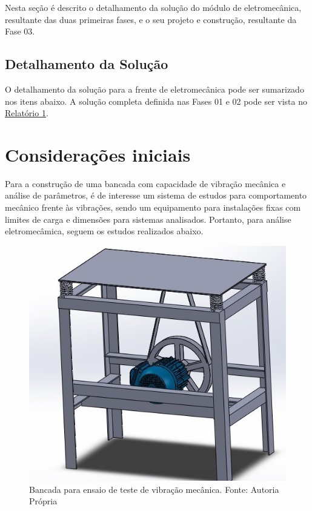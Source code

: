  \label{desenvolvimento_eletromecanica}
Nesta seção é descrito o detalhamento da solução do módulo de eletromecânica, resultante das duas primeiras fases,
e o seu projeto e construção, resultante da Fase 03.

\subsection{Detalhamento da Solução}

O detalhamento da solução para a frente de eletromecânica pode ser sumarizado nos itens abaixo. A solução completa definida nas
  Fases 01 e 02 pode ser vista no \href{https://drive.google.com/file/d/0B5InkGKx6O-MR1B3eVYzZFpjQ3c/view?usp=sharing}{Relatório 1}.

\section{Considerações iniciais}

Para a construção de uma bancada com capacidade de vibração mecânica e análise de parâmetros, é de interesse um sistema de estudos para comportamento mecânico frente às vibrações, sendo um equipamento para instalações fixas com limites de carga e dimensões para sistemas analisados. Portanto, para análise eletromecâmica, seguem os estudos realizados abaixo.

\begin{figure}[h!]
	\centering
		\includegraphics[keepaspectratio=true,scale=0.6]{figuras/1.png}
	\caption{Bancada para ensaio de teste de vibração mecânica. Fonte: Autoria Própria}
    \label{bancada}
\end{figure}

